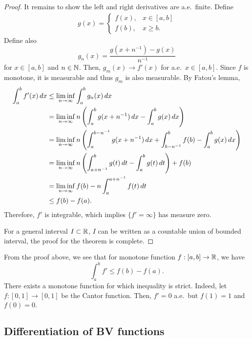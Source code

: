 \documentclass[a4paper]{article}
\begin{document}
\begin{proof}
  It remains to show the left and right derivatives are a.e.\ finite.
  Define
  \begin{align*}
    g(x) = \begin{cases}
             f(x), & x \in [a, b] \\
             f(b), & x \geq b.
           \end{cases}
  \end{align*}
  Define also
  \[
    g_n(x) = \frac{g(x + n^{-1}) - g(x)}{n^{-1}}
  \]
  for $x \in [a, b]$ and $n \in \mathbb{N}$. Then, $g_m (x) \to f'(x)$ for a.e.\
  $x \in [a, b]$. Since $f$ is monotone, it is measurable and thus $g_m$
  is also measurable. By Fatou's lemma,
  \begin{align*}
    \int_a^b f'(x) \, d x
     & \leq \liminf_{n \to \infty}  \int_a^b g_n (x) \, d x              \\
     & = \liminf_{n \to \infty}
    n \left( \int_a^b g(x + n^{-1}) \, d x - \int_a^b g(x) \, d x \right)  \\
     & = \liminf_{n \to \infty}
    n \left( \int_a^{b - n^{-1}} g(x + n^{-1}) \, d x
    + \int_{b - n^{-1}}^b f(b) - \int_a^b g(x) \, d x \right)            \\
     & = \liminf_{n \to \infty}
    n \left( \int_{a + n^{-1}}^b g(t) \, d t
    - \int_a^b g(t) \, d t  \right) + f(b)                               \\
     & = \liminf_{n \to \infty} f(b) - n \int_a^{a + n^{-1}} f(t) \, d t \\
     & \leq f(b) - f(a).
  \end{align*}
  Therefore, $f'$ is integrable, which implies $\{ f' = \infty \}$ has
  measure zero.

  For a general interval $I \subset \mathbb{R}$, $I$ can be written as a countable
  union of bounded interval, the proof for the theorem is complete.
\end{proof}

\begin{remark}
  From the proof above, we see that for monotone function $f : [a, b] \to
    \mathbb{R}$, we have
  \[
    \int_a^b f' \leq f(b) - f(a).
  \]
  There exists a monotone function for which inequality is strict. Indeed,
  let $f : [0, 1] \to [0, 1]$ be the Cantor function. Then, $f' = 0$ a.e.\
  but $f(1) = 1$ and $f(0) = 0$.
\end{remark}

\subsection{Differentiation of BV functions}
\end{document}
